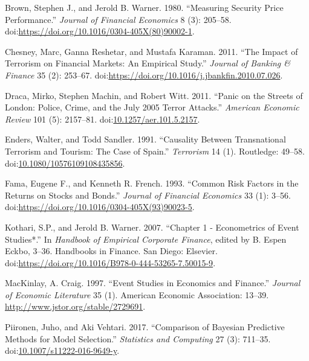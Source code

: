 \documentclass[]{AEA}
\begin{document}
\hypertarget{ref-BROWN1980205}{}
Brown, Stephen J., and Jerold B. Warner. 1980. ``Measuring Security
Price Performance.'' \emph{Journal of Financial Economics} 8 (3):
205--58.
doi:\href{https://doi.org/https://doi.org/10.1016/0304-405X(80)90002-1}{https://doi.org/10.1016/0304-405X(80)90002-1}.

\hypertarget{ref-CHESNEY2011253}{}
Chesney, Marc, Ganna Reshetar, and Mustafa Karaman. 2011. ``The Impact
of Terrorism on Financial Markets: An Empirical Study.'' \emph{Journal
of Banking \& Finance} 35 (2): 253--67.
doi:\href{https://doi.org/https://doi.org/10.1016/j.jbankfin.2010.07.026}{https://doi.org/10.1016/j.jbankfin.2010.07.026}.

\hypertarget{ref-10.1257ux2faer.101.5.2157}{}
Draca, Mirko, Stephen Machin, and Robert Witt. 2011. ``Panic on the
Streets of London: Police, Crime, and the July 2005 Terror Attacks.''
\emph{American Economic Review} 101 (5): 2157--81.
doi:\href{https://doi.org/10.1257/aer.101.5.2157}{10.1257/aer.101.5.2157}.

\hypertarget{ref-doi:10.1080ux2f10576109108435856}{}
Enders, Walter, and Todd Sandler. 1991. ``Causality Between
Transnational Terrorism and Tourism: The Case of Spain.''
\emph{Terrorism} 14 (1). Routledge: 49--58.
doi:\href{https://doi.org/10.1080/10576109108435856}{10.1080/10576109108435856}.

\hypertarget{ref-FAMA19933}{}
Fama, Eugene F., and Kenneth R. French. 1993. ``Common Risk Factors in
the Returns on Stocks and Bonds.'' \emph{Journal of Financial Economics}
33 (1): 3--56.
doi:\href{https://doi.org/https://doi.org/10.1016/0304-405X(93)90023-5}{https://doi.org/10.1016/0304-405X(93)90023-5}.

\hypertarget{ref-Kothari20073}{}
Kothari, S.P., and Jerold B. Warner. 2007. ``Chapter 1 - Econometrics of
Event Studies*.'' In \emph{Handbook of Empirical Corporate Finance},
edited by B. Espen Eckbo, 3--36. Handbooks in Finance. San Diego:
Elsevier.
doi:\href{https://doi.org/https://doi.org/10.1016/B978-0-444-53265-7.50015-9}{https://doi.org/10.1016/B978-0-444-53265-7.50015-9}.

\hypertarget{ref-10.2307ux2f2729691}{}
MacKinlay, A. Craig. 1997. ``Event Studies in Economics and Finance.''
\emph{Journal of Economic Literature} 35 (1). American Economic
Association: 13--39. \url{http://www.jstor.org/stable/2729691}.

\hypertarget{ref-Piironen2017}{}
Piironen, Juho, and Aki Vehtari. 2017. ``Comparison of Bayesian
Predictive Methods for Model Selection.'' \emph{Statistics and
Computing} 27 (3): 711--35.
doi:\href{https://doi.org/10.1007/s11222-016-9649-y}{10.1007/s11222-016-9649-y}.
\end{document}
